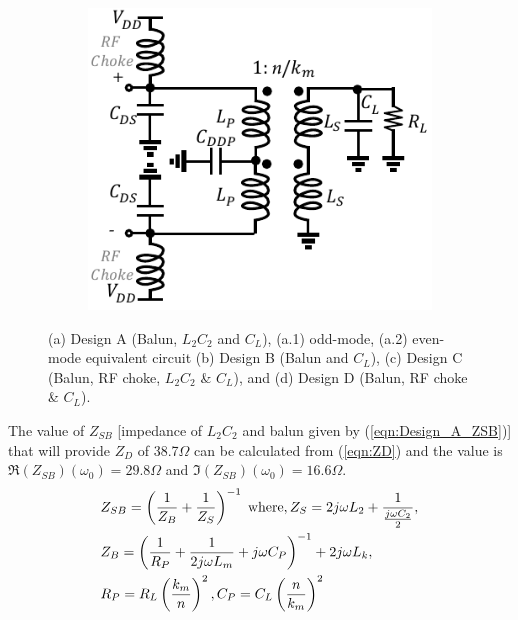 \documentclass[conference]{IEEEtran}
\begin{document}
\begin{figure}[!t]
\begin{subfigure}{0.24\textwidth}
\includegraphics[width=1\textwidth]{Images/Design/Design_D_FC.pdf}
\caption{}
\label{fig:Design_D_FC}
\end{subfigure}
\caption{(a) Design A (Balun, $L_2C_2$ and $C_L$), (a.1) odd-mode, (a.2) even-mode equivalent circuit (b) Design B (Balun and $C_L$), (c) Design C (Balun, RF choke, $L_2C_2$ \& $C_L$), and (d) Design D (Balun, RF choke \& $C_L$).}
\label{fig:Design_A_B_C_D}
\vspace{-0.2in}
\end{figure}

The value of $Z_{SB}$ [impedance of $L_2C_2$ and balun given by (\ref{eqn:Design_A_ZSB})] that will provide $Z_D$ of 38.7$\Omega$ can be calculated from (\ref{eqn:ZD}) and the value is $\Re(Z_{SB})(\omega_0) =  29.8\Omega$ and $\Im(Z_{SB})(\omega_0) = 16.6\Omega$.
\vspace{-0.05in}
\begin{equation}
\begin{aligned}
    &Z_{SB}=\left(\frac{1}{Z_B}+\frac{1}{Z_S}\right)^{-1}
    \hspace{1mm}\text{where}, Z_S=2j\omega  L_2+\frac{1}{\frac{j \omega C_2}{2}}, \\
    &Z_B=\left(\frac{1}{R_P}+\frac{1}{2j \omega  L_m}+j \omega C_P\right)^{-1}+2j \omega  L_k,\\ &R_P=R_L\left(\frac{k_m}{n}\right)^2,C_P=C_L\left(\frac{n}{k_m}\right)^2
\label{eqn:Design_A_ZSB}
\end{aligned}
\end{equation}
\end{document}
